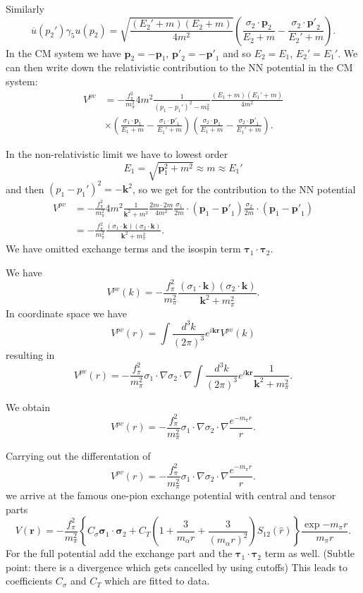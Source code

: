 \documentclass[%
oneside,                 %
final,                   %
10pt]{article}
\begin{document}
Similarly
\[
\overline{u}(p_{2}')\gamma_{5}u(p_{2})=\sqrt{\frac{(E_{2}'+m)(E_{2}+m)}
{4m^{2}}}\left(\frac{\sigma_{2}\cdot \mathbf{p}_{2}}{E_{2}+m}-
\frac{\sigma_{2}\cdot\mathbf{p'}_{2}}{E_{2}'+m}\right).
\]
In the CM system we have $\mathbf{p}_{2}=-\mathbf{p}_{1}$, $\mathbf{p'}_{2}=
-\mathbf{p'}_{1}$ and so $E_{2}=E_{1}$, $E_{2}'=E_{1}'$.  
We can then write down the relativistic contribution 
to the NN potential in the CM system: 
\begin{align}
V^{pv}&=-\frac{f_{\pi}^{2}}{m_{\pi}^{2}}4m^{2}\frac{1}{(p_{1}-p_{1}')^{2}-
m_{\pi}^{2}}\frac{(E_{1}+m)(E_{1}'+m)}{4m^{2}} \nonumber \\ 
 &\times\left(\frac{\sigma_{1}\cdot\mathbf{p}_{1}}{E_{1}+m}-\frac{\sigma_{1}
\cdot\mathbf{p'}_{1}}{E_{1}'+m}\right)\left(\frac{\sigma_{2}\cdot\mathbf{p}_{1}}
{E_{1}+m}-\frac{\sigma_{2}\cdot\mathbf{p'}_{1}}{E_{1}'+m}\right). \nonumber
\end{align}

In the non-relativistic limit we have to lowest order 
\[
E_{1}=\sqrt{\mathbf{p}_{1}^{2}+m^{2}}\approx m \approx E_{1}'
\]
and then $(p_{1}-p_{1}')^{2}=-\mathbf{k}^{2}$, so we get 
for the contribution to the NN potential
\begin{align}
V^{pv}&=-\frac{f_{\pi}^{2}}{m_{\pi}^{2}}4m^{2}\frac{1}{\mathbf{k}^{2}+m^{2}}
\frac{2m\cdot 2m}{4m^{2}}\frac{\sigma_{1}}{2m}\cdot(\mathbf{p}_{1}-\mathbf{p'}_{1})
\frac{\sigma_{2}}{2m}\cdot (\mathbf{p}_{1}-\mathbf{p'}_{1}) \nonumber \\ 
 &=-\frac{f_{\pi}^{2}}{m_{\pi}^{2}}
\frac{(\sigma_{1}\cdot\mathbf{k})(\sigma_{2}\cdot\mathbf{k})}{\mathbf{k}^{2}+m_{\pi}^{2}}.
\nonumber
\end{align}
We have omitted exchange terms and the isospin term $\mathbf{\tau}_1\cdot\mathbf{\tau}_2$.

We have
\[
V^{pv}(k)=-\frac{f_{\pi}^{2}}{m_{\pi}^{2}}
\frac{(\sigma_{1}\cdot\mathbf{k})(\sigma_{2}\cdot\mathbf{k})}{\mathbf{k}^{2}+m_{\pi}^{2}}.
\]
In coordinate space we have
\[
V^{pv}(r)=\int\frac{d^3k}{(2\pi)^3}e^{i\mathbf{kr}}V^{pv}(k)
\]
resulting in
\[
  V^{pv}(r)=-\frac{f_{\pi}^{2}}{m_{\pi}^{2}}
\sigma_{1}\cdot{\nabla}\sigma_{2}\cdot{\nabla}
\int\frac{d^3k}{(2\pi)^3}e^{i\mathbf{kr}}\frac{1}{\mathbf{k}^{2}+m_{\pi}^{2}}.
\]

We obtain
\[
V^{pv}(r)=-\frac{f_{\pi}^{2}}{m_{\pi}^{2}}\sigma_{1}\cdot{\nabla}\sigma_{2}\cdot{\nabla}\frac{e^{-m_{\pi}r}}{r}.
\]

Carrying out the differentation of
\[
V^{pv}(r)=-\frac{f_{\pi}^{2}}{m_{\pi}^{2}}\sigma_{1}\cdot{\nabla}\sigma_{2}\cdot{\nabla}\frac{e^{-m_{\pi}r}}{r}.
\]
we arrive at the famous one-pion exchange potential with central and tensor parts
\[
V(\mathbf{r})= -\frac{f_{\pi}^{2}}{m_{\pi}^{2}}\left\{C_{\sigma}\mathbf{\sigma}_1\cdot\mathbf{\sigma}_2+ C_T \left( 1 + \frac{3}{m_\alpha r} + \frac{3}{\left(m_\alpha r\right)^2}\right) S_{12}(\hat r)\right\}\frac{\exp{-m_\pi r}}{m_\pi r}.
\]
For the full potential add the exchange part and the $\mathbf{\tau}_1\cdot\mathbf{\tau}_2$ term as well. (Subtle point: there is a divergence which gets cancelled by using cutoffs) This leads to coefficients $C_{\sigma}$ and $C_T$ which are fitted to data.
\end{document}
